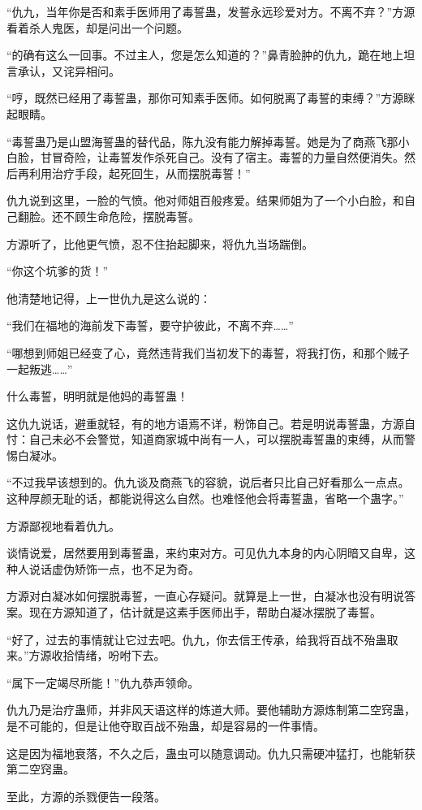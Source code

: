 \begin{this_body}
“仇九，当年你是否和素手医师用了毒誓蛊，发誓永远珍爱对方。不离不弃？”方源看着杀人鬼医，却是问出一个问题。

“的确有这么一回事。不过主人，您是怎么知道的？”鼻青脸肿的仇九，跪在地上坦言承认，又诧异相问。

“哼，既然已经用了毒誓蛊，那你可知素手医师。如何脱离了毒誓的束缚？”方源眯起眼睛。

“毒誓蛊乃是山盟海誓蛊的替代品，陈九没有能力解掉毒誓。她是为了商燕飞那小白脸，甘冒奇险，让毒誓发作杀死自己。没有了宿主。毒誓的力量自然便消失。然后再利用治疗手段，起死回生，从而摆脱毒誓！”

仇九说到这里，一脸的气愤。他对师姐百般疼爱。结果师姐为了一个小白脸，和自己翻脸。还不顾生命危险，摆脱毒誓。

方源听了，比他更气愤，忍不住抬起脚来，将仇九当场踹倒。

“你这个坑爹的货！”

他清楚地记得，上一世仇九是这么说的：

“我们在福地的海前发下毒誓，要守护彼此，不离不弃……”

“哪想到师姐已经变了心，竟然违背我们当初发下的毒誓，将我打伤，和那个贼子一起叛逃……”

什么毒誓，明明就是他妈的毒誓蛊！

这仇九说话，避重就轻，有的地方语焉不详，粉饰自己。若是明说毒誓蛊，方源自忖：自己未必不会警觉，知道商家城中尚有一人，可以摆脱毒誓蛊的束缚，从而警惕白凝冰。

“不过我早该想到的。仇九谈及商燕飞的容貌，说后者只比自己好看那么一点点。这种厚颜无耻的话，都能说得这么自然。也难怪他会将毒誓蛊，省略一个蛊字。”

方源鄙视地看着仇九。

谈情说爱，居然要用到毒誓蛊，来约束对方。可见仇九本身的内心阴暗又自卑，这种人说话虚伪矫饰一点，也不足为奇。

方源对白凝冰如何摆脱毒誓，一直心存疑问。就算是上一世，白凝冰也没有明说答案。现在方源知道了，估计就是这素手医师出手，帮助白凝冰摆脱了毒誓。

“好了，过去的事情就让它过去吧。仇九，你去信王传承，给我将百战不殆蛊取来。”方源收拾情绪，吩咐下去。

“属下一定竭尽所能！”仇九恭声领命。

仇九乃是治疗蛊师，并非风天语这样的炼道大师。要他辅助方源炼制第二空窍蛊，是不可能的，但是让他夺取百战不殆蛊，却是容易的一件事情。

这是因为福地衰落，不久之后，蛊虫可以随意调动。仇九只需硬冲猛打，也能斩获第二空窍蛊。

至此，方源的杀戮便告一段落。


\end{this_body}
